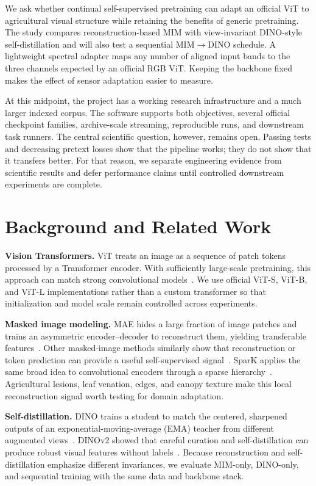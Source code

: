 \documentclass[10pt,twocolumn,letterpaper]{article}
\begin{document}
We ask whether continual self-supervised pretraining can adapt an official ViT
to agricultural visual structure while retaining the benefits of generic
pretraining. The study compares reconstruction-based MIM with view-invariant
DINO-style self-distillation and will also test a sequential
MIM$\rightarrow$DINO schedule. A lightweight spectral adapter maps any number
of aligned input bands to the three channels expected by an official RGB ViT.
Keeping the backbone fixed makes the effect of sensor adaptation easier to
measure.

At this midpoint, the project has a working research infrastructure and a much
larger indexed corpus. The software supports both objectives, several official
checkpoint families, archive-scale streaming, reproducible runs, and downstream
task runners. The central scientific question, however, remains open. Passing
tests and decreasing pretext losses show that the pipeline works; they do not
show that it transfers better. For that reason, we separate engineering evidence
from scientific results and defer performance claims until controlled downstream
experiments are complete.

\section{Background and Related Work}
\textbf{Vision Transformers.} ViT treats an image as a sequence of patch tokens
processed by a Transformer encoder. With sufficiently large-scale pretraining,
this approach can match strong convolutional models~\cite{dosovitskiy2021vit}.
We use official ViT-S, ViT-B, and ViT-L implementations rather than a custom
transformer so that initialization and model scale remain controlled across
experiments.

\textbf{Masked image modeling.} MAE hides a large fraction of image patches and
trains an asymmetric encoder--decoder to reconstruct them, yielding transferable
features~\cite{he2022mae}. Other masked-image methods similarly show that
reconstruction or token prediction can provide a useful self-supervised
signal~\cite{bao2022beit}. SparK applies the same broad idea to convolutional
encoders through a sparse hierarchy~\cite{tian2023spark}. Agricultural lesions,
leaf venation, edges, and canopy texture make this local reconstruction signal
worth testing for domain adaptation.

\textbf{Self-distillation.} DINO trains a student to match the centered,
sharpened outputs of an exponential-moving-average (EMA) teacher from different
augmented views~\cite{caron2021dino}. DINOv2 showed that careful curation and
self-distillation can produce robust visual features without labels~\cite{oquab2024dinov2}. Because reconstruction and self-distillation emphasize
different invariances, we evaluate MIM-only, DINO-only, and sequential training
with the same data and backbone stack.
\end{document}
